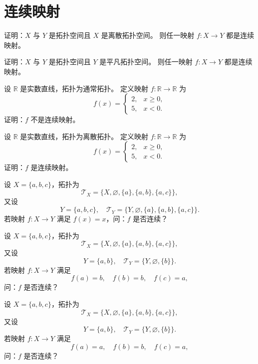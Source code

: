 \chapter{连续映射}
\begin{homework}[1]
证明：\(X\) 与 \(Y\) 是拓扑空间且 \(X\) 是离散拓扑空间。  
则任一映射 \(f:X\to Y\) 都是连续映射。
\end{homework}

\begin{homework}[2]
证明：\(X\) 与 \(Y\) 是拓扑空间且 \(Y\) 是平凡拓扑空间。  
则任一映射 \(f:X\to Y\) 都是连续映射。
\end{homework}

\begin{homework}[5]
设 \(\mathbb{R}\) 是实数直线，拓扑为通常拓扑。  
定义映射 \(f:\mathbb{R}\to\mathbb{R}\) 为
\[
f(x)=
\begin{cases}
2, & x\ge0,\\
5, & x<0.
\end{cases}
\]
证明：\(f\) 不是连续映射。
\end{homework}

\begin{homework}[6]
设 \(\mathbb{R}\) 是实数直线，拓扑为离散拓扑。  
定义映射 \(f:\mathbb{R}\to\mathbb{R}\) 为
\[
f(x)=
\begin{cases}
2, & x\ge0,\\
5, & x<0.
\end{cases}
\]
证明：\(f\) 是连续映射。
\end{homework}

\begin{homework}[7]
设 $X=\{a,b,c\}$，拓扑为 
\[
\mathcal{T}_X=\{X,\varnothing,\{a\},\{a,b\},\{a,c\}\},
\]
又设
\[
Y=\{a,b,c\},\quad 
\mathcal{T}_Y=\{Y,\varnothing,\{a\},\{a,b\},\{a,c\}\}.
\]
若映射 $f:X\to Y$ 满足 $f(x)=x$，问：$f$ 是否连续？
\end{homework}

\begin{homework}[8]
设 $X=\{a,b,c\}$，拓扑为 
\[
\mathcal{T}_X=\{X,\varnothing,\{a\},\{a,b\},\{a,c\}\},
\]
又设
\[
Y=\{a,b\},\quad 
\mathcal{T}_Y=\{Y,\varnothing,\{b\}\}.
\]
若映射 $f:X\to Y$ 满足 
\[
f(a)=b,\quad f(b)=b,\quad f(c)=a,
\]
问：$f$ 是否连续？
\end{homework}

\begin{homework}[9]
设 $X=\{a,b,c\}$，拓扑为 
\[
\mathcal{T}_X=\{X,\varnothing,\{a\},\{a,b\},\{a,c\}\},
\]
又设
\[
Y=\{a,b\},\quad 
\mathcal{T}_Y=\{Y,\varnothing,\{b\}\}.
\]
若映射 $f:X\to Y$ 满足 
\[
f(a)=a,\quad f(b)=b,\quad f(c)=a,
\]
问：$f$ 是否连续？
\end{homework}

